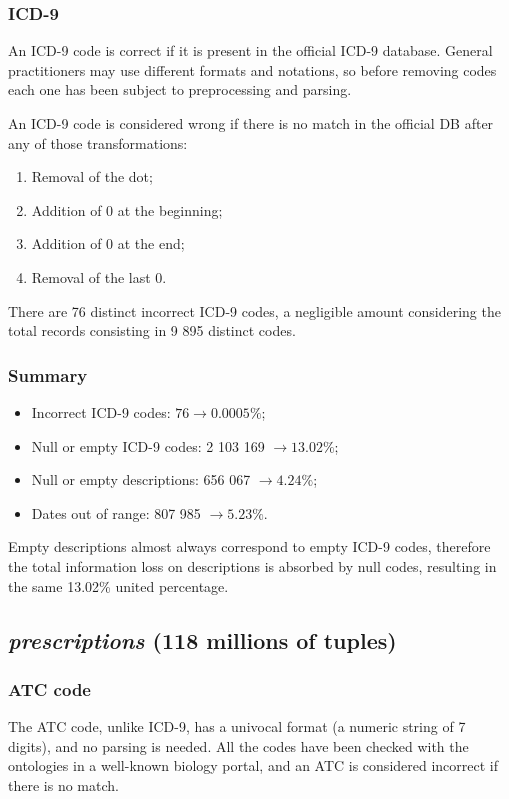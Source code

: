 \subsubsection{ICD-9}
An ICD-9 code is correct if it is present in the official ICD-9 database\cite{icd9}. General practitioners may use different formats and notations, so before removing codes each one has been subject to preprocessing and parsing.

An ICD-9 code is considered wrong if there is no match in the official DB after any of those transformations:
\begin{enumerate}
	\item Removal of the dot;
	\item Addition of 0 at the beginning;
	\item Addition of 0 at the end;
	\item Removal of the last 0.
\end{enumerate}

There are 76 distinct incorrect ICD-9 codes, a negligible amount considering the total records consisting in 9 895 distinct codes.

\subsubsection{Summary}
\begin{itemize}
	\item Incorrect ICD-9 codes: $76 \rightarrow 0.0005\%$;
	\item Null or empty ICD-9 codes: 2 103 169 $\rightarrow 13.02\%$;
	\item Null or empty descriptions: 656 067 $\rightarrow 4.24\%$;
	\item Dates out of range: 807 985 $\rightarrow 5.23\%$.
\end{itemize}

Empty descriptions almost always correspond to empty ICD-9 codes, therefore the total information loss on descriptions is absorbed by null codes, resulting in the same 13.02\% united percentage.

\subsection{\textit{prescriptions} (118 millions of tuples)}
\subsubsection{ATC code}
The ATC code, unlike ICD-9, has a univocal format (a numeric string of 7 digits), and no parsing is needed. All the codes have been checked with the ontologies in a well-known biology portal\cite{atc}, and an ATC is considered incorrect if there is no match.

